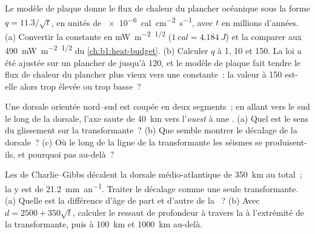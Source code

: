 \begin{exercise}[$\star\star$]\label{exo:b1:rifts-ridges-margins:7}
Le modèle de plaque donne le flux de chaleur du plancher océanique sous la forme $q = 11.3/\sqrt t$,
en unités de \qty{e-6}{cal.cm^{-2}.s^{-1}}, avec $t$ en millions d'années.
(a) Convertir la constante en \unit{mW.m^{-2}.\Ma^{1/2}} ($\qty{1}{cal} =
\qty{4.184}{J}$) et la comparer aux \qty{490}{mW.m^{-2}.\Ma^{1/2}} du
\cref{ch:b1:heat-budget}. (b) Calculer $q$ à 1, 10 et \qty{150}{\Ma}. La loi
a été ajustée sur un plancher de jusqu'à \qty{120}{\Ma}, et le modèle de plaque fait
tendre le flux de chaleur du plancher plus vieux vers une constante~: la valeur à
\qty{150}{\Ma} est-elle alors trop élevée ou trop basse~?
\end{exercise}

\begin{exercise}[$\star\star$]\label{exo:b1:rifts-ridges-margins:8}
Une dorsale orientée nord--sud est coupée en deux segments~; en allant vers le sud le long de la
dorsale, l'axe saute de \qty{40}{km} vers l'\emph{ouest} à une .
(a) Quel est le sens du glissement sur la transformante~? (b) Que semble montrer le décalage de
la dorsale~? (c) Où le long de la ligne de la transformante les
séismes se produisent-ils, et pourquoi pas au-delà~?
\end{exercise}

\begin{exercise}[$\star\star$]\label{exo:b1:rifts-ridges-margins:9}
Les  de Charlie--Gibbs décalent la dorsale médio-atlantique de
\qty{350}{km} au total~; la  y est de \qty{21.2}{mm.an^{-1}}.
Traiter le décalage comme une seule transformante. (a) Quelle est la différence d'âge
de part et d'autre de la ~? (b) Avec $d = 2500 + 350\sqrt t$, calculer le
ressaut de profondeur à travers la  à l'extrémité de la transformante, puis à \qty{100}{km}
et \qty{1000}{km} au-delà.
\end{exercise}

